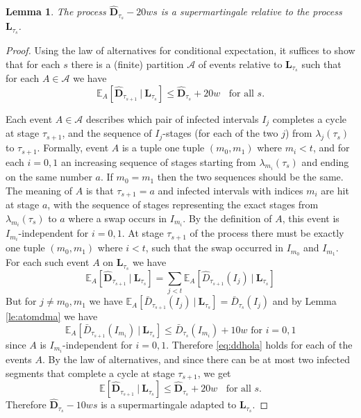 \documentclass[11pt]{article}
\theoremstyle{plain}
\newtheorem{lem}[thm]{Lemma}
\numberwithin{equation}{subsection}
\newcommand{\DD}{\mathbf{D}}
\newcommand{\LL}{\mathbf{L}}
\DeclareRobustCommand{\expec}[3][{\mbox{$\mathbb{E}$}}]{\ensuremath {#1}\left[ {#2} \ \big|\  {#3} \right]}
\DeclareRobustCommand{\expeco}[4][{\mbox{$\mathbb{E}$}}]{\ensuremath {#1}_{#4}\left[{#2} \ \big|\  {#3} \right]}
\begin{document}
\begin{lem}\label{le:dhasmgas}
The process $\hat{\DD}_{\tau_{s}}-20ws$ is a supermartingale relative to the process
$\LL_{\tau_{s}}$.
\end{lem}
\begin{proof}
Using the law of alternatives for conditional expectation, it suffices to show that for each $s$ there is a
(finite) partition
$\mathcal{A}$ of events relative to $\LL_{\tau_{s}}$ such that for each $A\in\mathcal{A}$ we have
 \begin{equation}\label{eq:ddhola}
 \expeco{\hat{\DD}_{\tau_{s+1}}}{\LL_{\tau_{s}}}{A} \leq  \hat{\DD}_{\tau_{s}} +20w\ \ \ \ \textrm{for all $s$.}
\end{equation}

Each event $A\in\mathcal{A}$ describes which pair of infected intervals $I_j$ completes a cycle
at stage $\tau_{s+1}$, and the sequence of $I_j$-stages (for each of the two $j$) from 
$\lambda_j(\tau_s)$ to $\tau_{s+1}$.
Formally, event $A$ is a tuple one tuple $(m_0,m_1)$ where $m_i<t$, 
and for each $i=0,1$ an increasing sequence
of stages starting from $\lambda_{m_i}(\tau_s)$ 
and ending on the same number $a$. If $m_0=m_1$ then the two sequences should be the same.
The meaning of $A$ is that $\tau_{s+1}=a$ and infected intervals with indices $m_i$ are hit at stage $a$, with
the sequence of stages representing the 
exact stages from $\lambda_{m_i}(\tau_s)$ to $a$ where a swap occurs in $I_{m_i}$.
By the definition of $A$, this event is
$I_{m_i}$-independent for $i=0,1$. 
At stage $\tau_{s+1}$ of the process there must be exactly one tuple $(m_0,m_1)$ where 
$i<t$, such that the swap occurred in
$I_{m_0}$ and $I_{m_1}$. For each such event $A$ on $\LL_{\tau_s}$ we have
 \[
 \expeco{\hat{\DD}_{\tau_{s+1}}}{\LL_{\tau_{s}}}{A} =
 \sum_{j<t} \expeco{\hat{D}_{\tau_{s+1}}(I_j)}{\LL_{\tau_{s}}}{A}
 \]
 But for $j\neq m_0, m_1$ we have
$\expeco{\bar{D}_{\tau_{s+1}}(I_j)}{\LL_{\tau_{s}}}{A}=\bar{D}_{\tau_{s}}(I_j)$ and  
by Lemma \ref{le:atomdma} we have
\[
\textrm{$\expeco{\bar{D}_{\tau_{s+1}}(I_{m_i})}{\LL_{\tau_{s}}}{A}\leq 
\bar{D}_{\tau_{s}}(I_{m_i})+10w$  for $i=0,1$}
\]
since $A$ is 
$I_{m_i}$-independent for $i=0,1$. Therefore
 \eqref{eq:ddhola} holds for each of the events $A$. By the law of alternatives,
 and since there can be at most two infected segments that complete a cycle at stage $\tau_{s+1}$, 
 we get
 \[
 \expec{\hat{\DD}_{\tau_{s+1}}}{\LL_{\tau_{s}}} \leq  \hat{\DD}_{\tau_{s}} +20w\ \ \ \ \textrm{for all $s$.}
\]
Therefore $\hat{\DD}_{\tau_s}-10ws$ is a supermartingale adapted to $\LL_{\tau_{s}}$.
\end{proof}
\end{document}
